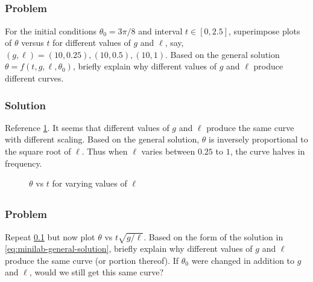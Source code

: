 \documentclass[12pt]{article}
\begin{document}
\subsection{}
\label{sec:minilab-part-1}
  \subsubsection*{Problem}
  For the initial conditions $\theta_0=3\pi/8$ and interval $t\in[0,2.5]$,
  superimpose plots of $\theta$ versus $t$ for different values of $g$ and $\ell$,
  say, $(g,\ell)=(10, 0.25), (10, 0.5), (10, 1)$. Based on the general solution
  $\theta = f(t,g,\ell,\theta_0)$, briefly explain why different values of $g$ and
  $\ell$ produce different curves.

  \subsubsection*{Solution}
  Reference \cref{fig:minilab-part-1-solution}. It seems that different values of $g$ and
  $\ell$ produce the same curve with different scaling. Based on the general
  solution, $\theta$ is inversely proportional to the square root of $\ell$.
  Thus when $\ell$ varies between $0.25$ to $1$, the curve halves in frequency.

  \begin{figure}
    \centering
    \caption{$\theta$ vs $t$ for varying values of $\ell$}
\label{fig:minilab-part-1-solution}
  \end{figure}

\subsection{}
\label{sec:minilab-part-2}
  \subsubsection*{Problem}
  Repeat \cref{sec:minilab-part-1} but now plot $\theta$ vs $t\sqrt{g/\ell}$.
  Based on the form of the solution in \cref{eq:minilab-general-solution},
  briefly explain why different values of $g$ and $\ell$ produce the same curve
  (or portion thereof). If $\theta_0$ were changed in addition to $g$ and
  $\ell$, would we still get this same curve?
\end{document}
